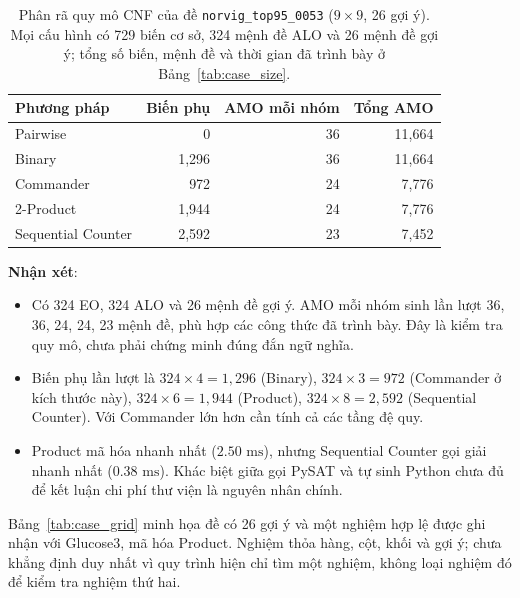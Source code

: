 \documentclass[a4paper,fleqn,nologo]{cas-sc}
\begin{document}
\begin{table}[pos=!htbp]
\centering
\small
\caption{Phân rã quy mô CNF của đề \texttt{norvig\_top95\_0053} ($9\times9$, 26 gợi ý). Mọi cấu hình có 729 biến cơ sở, 324 mệnh đề ALO và 26 mệnh đề gợi ý; tổng số biến, mệnh đề và thời gian đã trình bày ở Bảng~\ref{tab:case_size}.}
\label{tab:case_enc}
\begin{tabular}{@{}l r r r@{}}
\toprule
\textbf{Phương pháp} & \textbf{Biến phụ} & \textbf{AMO mỗi nhóm} & \textbf{Tổng AMO} \\
\midrule
Pairwise & 0 & 36 & 11,664 \\
Binary & 1,296 & 36 & 11,664 \\
Commander & 972 & 24 & 7,776 \\
2-Product & 1,944 & 24 & 7,776 \\
Sequential Counter & 2,592 & 23 & 7,452 \\
\bottomrule
\end{tabular}
\end{table}

\textbf{Nhận xét}:
\begin{itemize}
    \item Có 324 EO, 324 ALO và 26 mệnh đề gợi ý. AMO mỗi nhóm sinh lần lượt 36, 36, 24, 24, 23 mệnh đề, phù hợp các công thức đã trình bày. Đây là kiểm tra quy mô, chưa phải chứng minh đúng đắn ngữ nghĩa.
    \item Biến phụ lần lượt là $324\times4=1,296$ (Binary), $324\times3=972$ (Commander ở kích thước này), $324\times6=1,944$ (Product), $324\times8=2,592$ (Sequential Counter). Với Commander lớn hơn cần tính cả các tầng đệ quy.
    \item Product mã hóa nhanh nhất ($2.50\text{ ms}$), nhưng Sequential Counter gọi giải nhanh nhất ($0.38\text{ ms}$). Khác biệt giữa gọi PySAT và tự sinh Python chưa đủ để kết luận chi phí thư viện là nguyên nhân chính.
\end{itemize}

Bảng~\ref{tab:case_grid} minh họa đề có 26 gợi ý và một nghiệm hợp lệ được ghi nhận với Glucose3, mã hóa Product. Nghiệm thỏa hàng, cột, khối và gợi ý; chưa khẳng định duy nhất vì quy trình hiện chỉ tìm một nghiệm, không loại nghiệm đó để kiểm tra nghiệm thứ hai.
\end{document}
